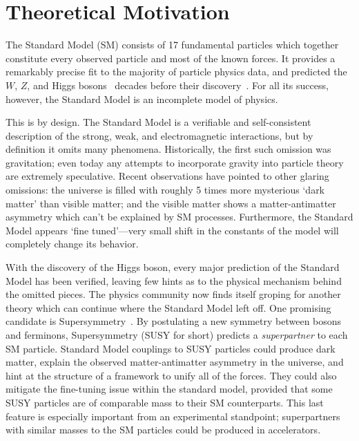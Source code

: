 \chapter{Theoretical Motivation}

The Standard Model (SM) consists of 17 fundamental particles which together constitute every observed particle and most of the known forces.
It provides a remarkably precise fit to the majority of particle physics data, and predicted the $W$, $Z$, and Higgs bosons~\cite{wzmass1,higgs1,higgs2} decades before their discovery~\cite{ua1w,ua2w,ua1z,ua2z,atlashiggs,cmshiggs}.
For all its success, however, the Standard Model is an incomplete model of physics.

This is by design. The Standard Model is a verifiable and self-consistent description of the strong, weak, and electromagnetic interactions, but by definition it omits many phenomena.
Historically, the first such omission was gravitation; even today any attempts to incorporate gravity into particle theory are extremely speculative.
Recent observations have pointed to other glaring omissions:
the universe is filled with roughly 5 times more mysterious `dark matter' than visible matter;
and the visible matter shows a matter-antimatter asymmetry which can't be explained by SM processes.
Furthermore, the Standard Model appears `fine tuned'---very small shift in the constants of the model will completely change its behavior.

With the discovery of the Higgs boson, every major prediction of the Standard Model has been verified, leaving few hints as to the physical mechanism behind the omitted pieces.
The physics community now finds itself groping for another theory which can continue where the Standard Model left off. One promising candidate is Supersymmetry~\cite{susyprimer,srednicki,pdg2014}.
By postulating a new symmetry between bosons and ferminons, Supersymmetry (SUSY for short) predicts a \emph{superpartner} to each SM particle. Standard Model couplings to SUSY particles could produce dark matter, explain the observed matter-antimatter asymmetry in the universe, and hint at the structure of a framework to unify all of the forces.
They could also mitigate the fine-tuning issue within the standard model, provided that some SUSY particles are of comparable mass to their SM counterparts. This last feature is especially important from an experimental standpoint; superpartners with similar masses to the SM particles could be produced in accelerators.


